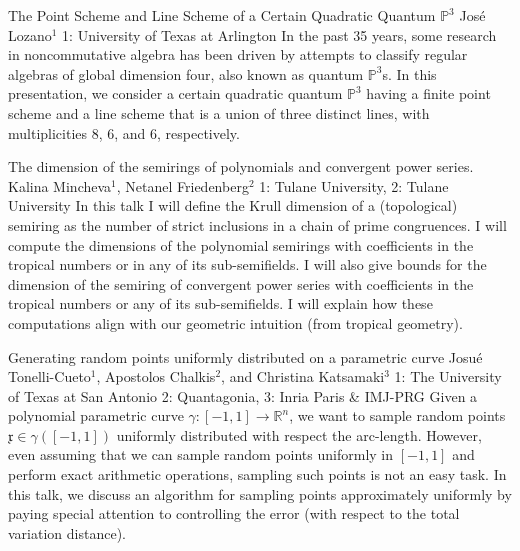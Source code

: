 \begin{addmargin}[2em]{0em}
\vspace{1.5ex}
\abs
{The Point Scheme and Line Scheme of a Certain Quadratic Quantum $\mathbb{P}^3$}%
{Jos\'{e} Lozano$^{1}$}
{1: University of Texas at Arlington}
{In the past 35 years, some research in noncommutative algebra has been driven by attempts to classify regular algebras of global dimension four, also known as quantum $\mathbb{P}^{3}$s. In this presentation, we consider a certain quadratic quantum $\mathbb{P}^{3}$ having a finite point scheme and a line scheme that is a union of three distinct lines, with multiplicities 8, 6, and 6, respectively.}


\vspace{1.5ex}
\abs
{The dimension of the semirings of polynomials and convergent power series.}
{Kalina Mincheva$^1$, Netanel Friedenberg$^2$}
{1: Tulane University, 2: Tulane University}
{In this talk I will define the Krull dimension of a (topological) semiring as the number of strict inclusions in a chain of prime congruences. I will compute the dimensions of the polynomial semirings with coefficients in the tropical numbers or in any of its sub-semifields. I will also give bounds for the dimension of the semiring of convergent power series with coefficients in the tropical numbers or any of its sub-semifields. I will explain how these computations align with our geometric intuition (from tropical geometry).}


\vspace{1.5ex}
\abs
{Generating random points uniformly distributed on a parametric curve}
{Josué Tonelli-Cueto$^{1}$, Apostolos Chalkis$^{2}$, and Christina Katsamaki$^{3}$}
{1: The University of Texas at San Antonio 2: Quantagonia, 3: Inria Paris \& IMJ-PRG}
{Given a polynomial parametric curve $\gamma:[-1,1]\rightarrow \mathbb{R}^n$, we want to sample random points $\mathfrak{x}\in\gamma([-1,1])$ uniformly distributed with respect the arc-length. However, even assuming that we can sample random points uniformly in $[-1,1]$ and perform exact arithmetic operations, sampling such points is not an easy task. In this talk, we discuss an algorithm for sampling points approximately uniformly by paying special attention to controlling the error (with respect to the total variation distance).}



\end{addmargin}
